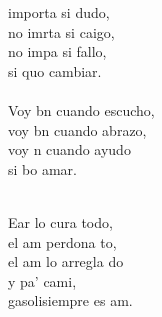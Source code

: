 \begin{cancion}%
	 importa si dudo,  \\
	no imrta si caigo,  \\
	no impa si fallo, \\
	si quo cambiar. \\
\jump\\
	Voy bn cuando escucho, \\
	voy bn cuando abrazo, \\
	voy n cuando ayudo \\
	si bo amar. \\\jump\\
	\begin{chorus}%
	Ear lo cura todo, \\
	el am perdona to, \\
	el am lo arregla do \\
	y pa' cami, \\
	gasolisiempre es am.\\
	\end{chorus}%
	\jump\\
\end{cancion}%

